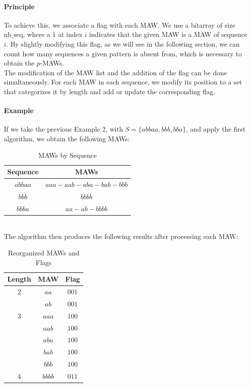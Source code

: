 \documentclass[conference]{IEEEtran}
\begin{document}
\paragraph{Principle}
To achieve this, we associate a flag with each MAW. We use a bitarray of size $\text{nb\_seq}$, where a $1$ at index $i$ indicates that the given MAW is a MAW of sequence $i$. By slightly modifying this flag, as we will see in the following section, we can count how many sequences a given pattern is absent from, which is necessary to obtain the $p$-MAWs.\\
The modification of the MAW list and the addition of the flag can be done simultaneously. For each MAW in each sequence, we modify its position to a set that categorizes it by length and add or update the corresponding flag.

\paragraph{Example}
If we take the previous Example 2, with $S = \{abbaa, bbb, bba\}$, and apply the first algorithm, we obtain the following MAWs:\\
\begin{table}[htbp]
\caption{MAWs by Sequence}
\begin{center}
\begin{tabular}{|c|c|}
\hline
\textbf{Sequence} & \textbf{MAWs} \\
\hline
$abbaa$ & $aaa - aab - aba - bab - bbb$ \\
\hline
$bbb$ & $bbbb$ \\
\hline
$bbba$ & $aa - ab - bbbb$ \\
\hline
\end{tabular}
\end{center}
\end{table}\\
The algorithm then produces the following results after processing each MAW:\\
\begin{table}[htbp]
\caption{Reorganized MAWs and Flags}
\begin{center}
\begin{tabular}{|c|c|c|}
\hline
\textbf{Length} & \textbf{MAW} & \textbf{Flag} \\
\hline
$2$ & $aa$ & $001$ \\
\cline{2-3}
    & $ab$ & $001$ \\
\hline
$3$ & $aaa$ & $100$ \\
\cline{2-3}
    & $aab$ & $100$ \\
\cline{2-3}
    & $aba$ & $100$ \\
\cline{2-3}
    & $bab$ & $100$ \\
\cline{2-3}
    & $bbb$ & $100$ \\
\hline
$4$ & $bbbb$ & $011$ \\
\hline
\end{tabular}
\end{center}
\end{table}
\end{document}
